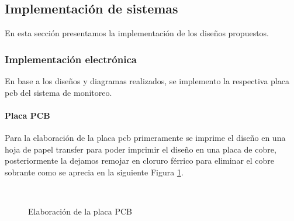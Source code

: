 \subsection{Implementación de sistemas}
En esta sección presentamos la implementación de los diseños propuestos.
\subsubsection{Implementación electrónica}
En base a los diseños y diagramas realizados, se implemento la respectiva placa \acrshort{pcb} del sistema de monitoreo.
\paragraph{Placa PCB}
Para la elaboración de la placa \acrshort{pcb} primeramente se imprime el diseño en una hoja de papel transfer para poder imprimir el diseño en una placa de cobre, posteriormente la dejamos remojar en cloruro férrico para eliminar el cobre sobrante como se aprecia en la siguiente Figura \ref{fig:pcbelab}.
\begin{figure}[hpt]
    \centering
    \caption{Elaboración de la placa PCB}
            \qquad      %
        \\
    \label{fig:pcbelab}
\end{figure}
